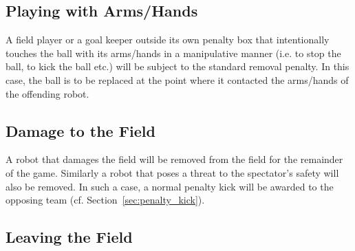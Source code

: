 \documentclass[12pt]{article}
\newcommand{\cf}{\mbox{cf.}\xspace}
\begin{document}
%
%
%
%
%

\subsection{Playing with Arms/Hands}
\label{sec:hand_ball}
A field player or a goal keeper outside its own penalty box that intentionally touches the ball with its arms/hands in a manipulative manner (i.e. to stop the ball, to kick the ball etc.) will be subject to the standard removal penalty. In this case, the ball is to be replaced at the point where it contacted the arms/hands of the offending robot.


\subsection{Damage to the Field}

A robot that damages the field
will be removed from the field for the remainder
of the game. Similarly a robot that poses a threat to the
spectator's safety will also be removed. In such a case, a normal
penalty kick will be awarded to the opposing team (\cf
Section~\ref{sec:penalty_kick}).

\subsection{Leaving the Field}
\end{document}
